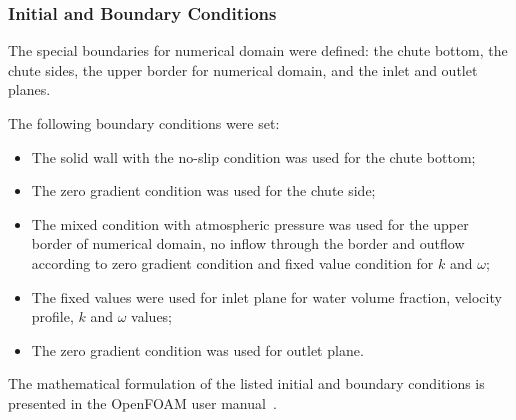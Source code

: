 \documentclass[mathematics,article,accept,pdftex,moreauthors]{Definitions/mdpi}
\begin{document}
\subsubsection{Initial and Boundary Conditions}

The special boundaries for numerical domain were defined: the chute bottom, the chute sides, the upper border for numerical domain, and the inlet and outlet planes.

The following boundary conditions were set:

\begin{itemize}
    \item The solid wall with the no-slip condition was used for the chute bottom;
    \item The zero gradient condition was used for the chute side;
    \item The mixed condition with atmospheric pressure was used for the upper border of numerical domain, no inflow through the border and outflow according to zero gradient condition and fixed value condition for $k$ and $\omega$;
    \item The fixed values were used for inlet plane for water volume fraction, velocity profile, $k$ and $\omega$ values;
    \item The zero gradient condition was used for outlet plane.
\end{itemize}

The mathematical formulation of the listed initial and boundary conditions is presented in the OpenFOAM user manual~\cite{OFUG}.
\end{document}
